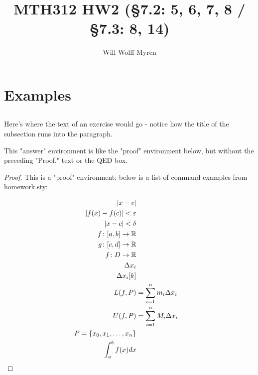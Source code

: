 \documentclass{article}
\title{MTH312 HW2 (\S7.2: 5, 6, 7, 8 /  \S7.3: 8, 14) }
\author{Will Wolff-Myren}
\begin{document}
\section{Examples}

\subsection{}
Here's where the text of an exercise would go - notice how the title of the subsection runs into the paragraph.

    
    \begin{answer}
        This "answer" environment is like the "proof" environment below, 
        but without the preceding "Proof." text or the QED box.
    \end{answer}

    \begin{proof}
    
        This is a "proof" environment; below is a list of command examples from homework.sty:
    
        \begin{align*}
            \abs{x-c} \\
            \absle{f(x)-f(c)} \\
            \absld{x-c} \\
            \fabr \\
            \func[g]{[c,d]} \\
            \func{D} \\
            \deltaxi \\
            \deltaxi[k] \\
            \lowersum \\
            \uppersum \\
            \partition \\
            \intab f(x)dx
        \end{align*}
    
    \end{proof}
\end{document}
